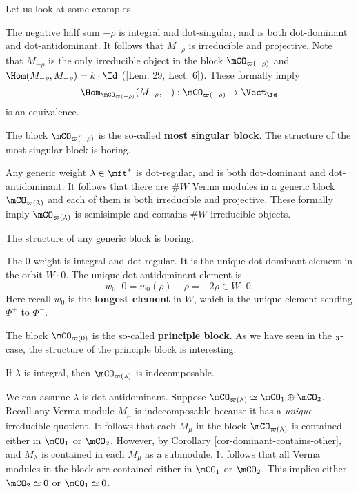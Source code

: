  	Let us look at some examples.

	\begin{exam}
		The negative half sum $-\rho$ is integral and dot-singular, and is both dot-dominant and dot-antidominant. It follows that $M_{-\rho}$ is irreducible and projective. Note that $M_{-\rho}$ is the only irreducible object in the block $\mCO_{\varpi(-\rho)}$ and $\Hom(M_{-\rho},M_{-\rho}) = k\cdot\Id$ ([Lem. 29, Lect. 6]). These formally imply
		\[
			\Hom_{\mCO_{\varpi(-\rho)}}(M_{-\rho},-): \mCO_{\varpi(-\rho)} \to \Vect_{\fd}
		\]
		is an equivalence.

		The block $\mCO_{\varpi(-\rho)}$ is the so-called \textbf{most singular block}. The structure of the most singular block is boring.
	\end{exam}

	\begin{rem}
		Any generic weight $\lambda \in \mft^*$ is dot-regular, and is both dot-dominant and dot-antidominant. It follows that there are $\# W$ Verma modules in a generic block $\mCO_{\varpi(\lambda)}$ and each of them is both irreducible and projective. These formally imply $\mCO_{\varpi(\lambda)}$ is semisimple and contains $\# W$ irreducible objects.

		The structure of any generic block is boring.
	\end{rem}

	
	\begin{rem}
		The $0$ weight is integral and dot-regular. It is the unique dot-dominant element in the orbit $W\cdot 0$. The unique dot-antidominant element is
		\[
			w_0\cdot 0 = w_0(\rho) -\rho = -2\rho \in W\cdot 0.
		\]
		Here recall $w_0$ is the \textbf{longest element} in $W$, which is the unique element sending $\Phi^+$ to $\Phi^-$.

		The block $\mCO_{\varpi(0)}$ is the so-called \textbf{principle block}. As we have seen in the $\sl_3$-case, the structure of the principle block is interesting.
	\end{rem}

	\begin{prop}
		If $\lambda$ is integral, then $\mCO_{\varpi(\lambda)}$ is indecomposable.
	\end{prop}

	\proof
		We can assume $\lambda$ is dot-antidominant. Suppose $\mCO_{\varpi(\lambda)}\simeq \mCO_1\oplus \mCO_2$. Recall any Verma module $M_\mu$ is indecomposable because it has a \emph{unique} irreducible quotient. It follows that each $M_\mu$ in the block $\mCO_{\varpi(\lambda)}$ is contained either in $\mCO_1$ or $\mCO_2$. However, by Corollary \ref{cor-dominant-contains-other}, and $M_\lambda$ is contained in each $M_\mu$ as a submodule. It follows that all Verma modules in the block are contained either in $\mCO_1$ or $\mCO_2$. This implies either $\mCO_2\simeq 0$ or $\mCO_1\simeq 0$.

